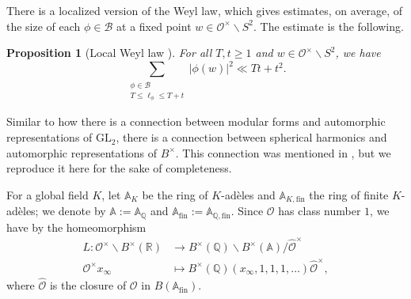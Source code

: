 \documentclass[11pt]{amsart}
\newtheorem{proposition}[theorem]{Proposition}
\theoremstyle{definition}
\begin{document}
There is a localized version of the Weyl law, which gives estimates, on average, of the size of each $\phi \in \mathcal{B}$ at a fixed point $w \in \mathcal{O}^{\times} \backslash S^2$. The estimate is the following.

\begin{proposition}[Local Weyl law {\cite[\S 5, Corollary]{MinakshisundaramPleijelLocalWeylLaw}}]\label{LocalWeylLaw}
For all $T,t\geq 1$ and $w\in \mathcal{O}^{\times} \backslash S^2$, we have $$ \sum_{\substack{\phi \in \mathcal{B} \\ T \leq \ell_{\phi} \leq T+t}} |\phi(w)|^2 \ll Tt + t^2. $$
\end{proposition}

Similar to how there is a connection between modular forms and automorphic representations of $\mathrm{GL}_{2}$, there is a connection between spherical harmonics and automorphic representations of $B^{\times}$. This connection was mentioned in \cite[\S 2.1]{garza2025geodesicrestrictionproblemarithmetic}, but we reproduce it here for the sake of completeness.

For a global field $K$, let $\mathbb{A}_{K}$ be the ring of $K$-adèles and $\mathbb{A}_{K,\text{fin}}$ the ring of finite $K$-adèles; we denote by $\mathbb{A} := \mathbb{A}_{\mathbb{Q}}$ and $\mathbb{A}_{\text{fin}} := \mathbb{A}_{\mathbb{Q},\text{fin}}$. Since $\mathcal{O}$ has class number $1$, we have by \cite[eq.~(2.20)]{AutRepGetz} the homeomorphism 
\begin{align}
    L : \mathcal{O}^{\times} \backslash B^{\times}(\mathbb{R}) &\longrightarrow B^{\times}(\mathbb{Q}) \backslash B^{\times}(\mathbb{A}) / \widehat{\mathcal{O}}^{\times} \label{homeo2.20Bcross} \\
    \mathcal{O}^{\times} x_{\infty} &\longmapsto B^{\times}(\mathbb{Q}) (x_{\infty},1,1,1,\dots ) \widehat{\mathcal{O}}^{\times}, \nonumber
\end{align}
where $\widehat{\mathcal{O}}$ is the closure of $\mathcal{O}$ in $B(\mathbb{A}_{\text{fin}})$. 
\end{document}
